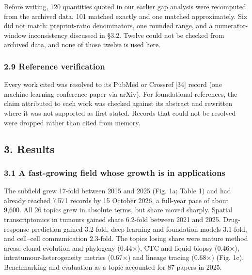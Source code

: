 \documentclass[11pt]{article}
\begin{document}
Before writing, 120 quantities quoted in our earlier gap analysis were
recomputed from the archived data. 101 matched exactly and one matched
approximately. Six did not match: preprint-ratio denominators, one
rounded range, and a numerator-window inconsistency discussed in §3.2.
Twelve could not be checked from archived data, and none of those twelve
is used here.

\subsubsection{2.9 Reference verification}\label{reference-verification}

Every work cited was resolved to its PubMed or Crossref {[}34{]} record
(one machine-learning conference paper via arXiv). For foundational
references, the claim attributed to each work was checked against its
abstract and rewritten where it was not supported as first stated.
Records that could not be resolved were dropped rather than cited from
memory.

\subsection{3. Results}\label{results}

\subsubsection{3.1 A fast-growing field whose growth is in
applications}\label{a-fast-growing-field-whose-growth-is-in-applications}

The subfield grew 17-fold between 2015 and 2025 (Fig. 1a; Table 1) and
had already reached 7,571 records by 15 October 2026, a full-year pace
of about 9,600. All 26 topics grew in absolute terms, but share moved
sharply. Spatial transcriptomics in tumours gained share 6.2-fold
between 2021 and 2025. Drug-response prediction gained 3.2-fold, deep
learning and foundation models 3.1-fold, and cell--cell communication
2.3-fold. The topics losing share were mature method areas: clonal
evolution and phylogeny (0.44×), CTC and liquid biopsy (0.46×),
intratumour-heterogeneity metrics (0.67×) and lineage tracing (0.68×)
(Fig. 1c). Benchmarking and evaluation as a topic accounted for 87
papers in 2025.
\end{document}
